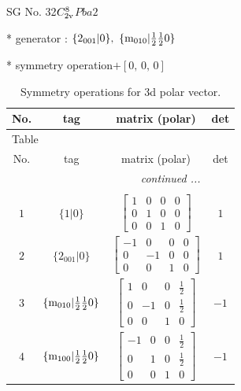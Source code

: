\documentclass[fleqn,8pt]{jsarticle}
\begin{document}
\setcounter{MaxMatrixCols}{32}

\renewcommand{\tablename}{Table~}
\renewcommand{\figurename}{Figure~}
\begin{center}
\LARGE
SG No. 32\quad$C_{\rm 2v}^{8}$\quad$Pba2$\quad[ orthorhombic ]
\end{center}

* generator : $\{2{}_{001}|0\},\,\,\{{\rm m}_{010}|\frac{1}{2} \frac{1}{2} 0\}$

* symmetry operation\quad$+\left[ 0,\, 0,\, 0 \right]$
\renewcommand{\arraystretch}{1.3}
\begin{longtable}{cccc}
\caption{Symmetry operations for 3d polar vector.}
 \\
 \hline \hline
No. & tag & matrix (polar) & det \\ \hline \endfirsthead

\multicolumn{3}{l}{\tablename\ \thetable{}} \\
 \hline \hline
No. & tag & matrix (polar) & det \\ \hline \endhead

 \hline \hline
\multicolumn{3}{r}{\footnotesize\it continued ...} \\ \endfoot

 \hline \hline
\multicolumn{3}{r}{} \\ \endlastfoot

$ 1 $ & $ \{1|0\} $ & $ \begin{bmatrix} 1 & 0 & 0 & 0 \\ 0 & 1 & 0 & 0 \\ 0 & 0 & 1 & 0 \end{bmatrix} $ & $ 1 $ \\ \hline
$ 2 $ & $ \{2{}_{001}|0\} $ & $ \begin{bmatrix} -1 & 0 & 0 & 0 \\ 0 & -1 & 0 & 0 \\ 0 & 0 & 1 & 0 \end{bmatrix} $ & $ 1 $ \\ \hline
$ 3 $ & $ \{{\rm m}_{010}|\frac{1}{2} \frac{1}{2} 0\} $ & $ \begin{bmatrix} 1 & 0 & 0 & \frac{1}{2} \\ 0 & -1 & 0 & \frac{1}{2} \\ 0 & 0 & 1 & 0 \end{bmatrix} $ & $ -1 $ \\ \hline
$ 4 $ & $ \{{\rm m}_{100}|\frac{1}{2} \frac{1}{2} 0\} $ & $ \begin{bmatrix} -1 & 0 & 0 & \frac{1}{2} \\ 0 & 1 & 0 & \frac{1}{2} \\ 0 & 0 & 1 & 0 \end{bmatrix} $ & $ -1 $ \\
\end{longtable}
\end{document}
